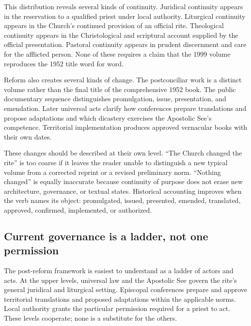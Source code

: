 This distribution reveals several kinds of continuity. Juridical continuity
appears in the reservation to a qualified priest under local authority.
Liturgical continuity appears in the Church's continued provision of an
official rite. Theological continuity appears in the Christological and
scriptural account supplied by the official presentation. Pastoral continuity
appears in prudent discernment and care for the afflicted person. None of
these requires a claim that the 1999 volume reproduces the 1952 title word for
word.

Reform also creates several kinds of change. The postconciliar work is a
distinct volume rather than the final title of the comprehensive 1952 book.
The public documentary sequence distinguishes promulgation, issue,
presentation, and emendation. Later universal acts clarify how conferences
prepare translations and propose adaptations and which dicastery exercises
the Apostolic See's competence. Territorial implementation produces approved
vernacular books with their own dates.

These changes should be described at their own level. ``The Church changed
the rite'' is too coarse if it leaves the reader unable to distinguish a new
typical volume from a corrected reprint or a revised preliminary norm.
``Nothing changed'' is equally inaccurate because continuity of purpose does
not erase new architecture, governance, or textual states. Historical
accounting improves when the verb names its object: promulgated, issued,
presented, emended, translated, approved, confirmed, implemented, or
authorized.

\subsection{Current governance is a ladder, not one permission}

The post-reform framework is easiest to understand as a ladder of actors and
acts. At the upper levels, universal law and the Apostolic See govern the
rite's general juridical and liturgical setting. Episcopal conferences prepare
and approve territorial translations and proposed adaptations within the
applicable norms. Local authority grants the particular permission required
for a priest to act. These levels cooperate; none is a substitute for the
others.

